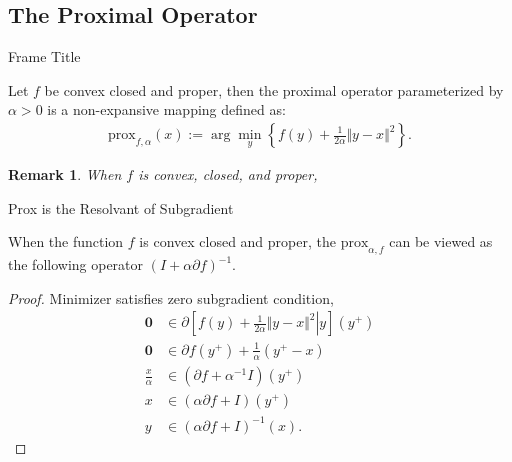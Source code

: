 \documentclass[11pt]{beamer}
\newtheorem{remark}{Remark}
\begin{document}
    \subsection{The Proximal Operator}
        \begin{frame}{Frame Title}
            \begin{definition}
                Let $f$ be convex closed and proper, then the proximal operator parameterized by $\alpha > 0$ is a non-expansive mapping defined as: 
                \begin{align*}
                    \text{prox}_{f, \alpha}(x) := 
                    \arg\min_{y}\left\lbrace
                        f(y) + \frac{1}{2\alpha} \Vert y - x\Vert^2
                    \right\rbrace. 
                \end{align*}
            \end{definition}  
            \begin{remark}
                When $f$ is convex, closed, and proper, 
            \end{remark}
        \end{frame}

        \begin{frame}{Prox is the Resolvant of Subgradient}
            \begin{lemma}\label{lemma:prox_alternative_form}
                When the function $f$ is convex closed and proper, the $\text{prox}_{\alpha, f}$ can be viewed as the following operator $(I + \alpha \partial f)^{-1}$. 
            \end{lemma}
            \begin{proof}
                Minimizer satisfies zero subgradient condition, 
                {\scriptsize
                \begin{align*}
                    \mathbf 0 &\in \partial
                    \left[
                        \left.
                            f(y) + \frac{1}{2\alpha} \Vert y - x\Vert^2 
                        \right| y
                    \right](y^+)
                    \\
                    \mathbf 0 &\in \partial f(y^+) + \frac{1}{\alpha}(y^+ - x)
                    \\
                    \frac{x}{\alpha} &\in 
                    (\partial f + \alpha^{-1}I)(y^+)
                    \\
                    x &\in 
                    (\alpha \partial f + I)(y^+)
                    \\
                    y &\in (\alpha\partial f+ I)^{-1}(x).
                \end{align*}
                }
            \end{proof}
                
        \end{frame}
        
\end{document}
